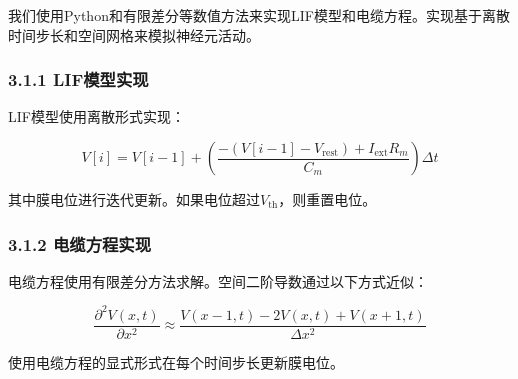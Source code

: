 \documentclass[12pt]{article}
\begin{document}
我们使用Python和有限差分等数值方法来实现LIF模型和电缆方程。实现基于离散时间步长和空间网格来模拟神经元活动。

\subsubsection*{3.1.1 LIF模型实现}

LIF模型使用离散形式实现：

\[
V[i] = V[i-1] + \left( \frac{-(V[i-1] - V_{\text{rest}}) + I_{\text{ext}} R_m}{C_m} \right) \Delta t
\]

其中膜电位进行迭代更新。如果电位超过\( V_{\text{th}} \)，则重置电位。

\subsubsection*{3.1.2 电缆方程实现}

电缆方程使用有限差分方法求解。空间二阶导数通过以下方式近似：

\[
\frac{\partial^2 V(x,t)}{\partial x^2} \approx \frac{V(x-1,t) - 2V(x,t) + V(x+1,t)}{\Delta x^2}
\]

使用电缆方程的显式形式在每个时间步长更新膜电位。

\end{document}

